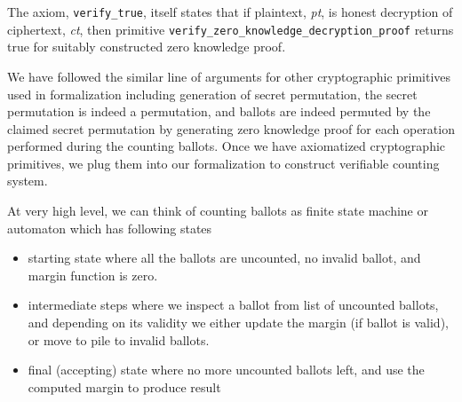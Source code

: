 \documentclass{llncs}
\begin{document}
 The axiom, \texttt{verify\_true}, itself states that if plaintext, \textit{pt}, 
 is honest
 decryption of ciphertext, \textit{ct}, then primitive
 \texttt{verify\_zero\_knowledge\_decryption\_proof} returns true for 
 suitably constructed zero knowledge proof.
 
 We have followed the similar line of 
 arguments for other cryptographic primitives used in formalization including generation
  of secret permutation, 
 the secret permutation is indeed a permutation, and ballots are indeed permuted by the
 claimed secret permutation by generating zero knowledge proof 
 for each operation performed during the counting ballots. Once we have axiomatized
  cryptographic primitives, we plug them into our 
 formalization to construct verifiable counting system. 
 
 At very high level, we can think of counting ballots as finite state machine or 
 automaton which has following states 
 \begin{itemize}
 \item starting state where all the ballots are uncounted, 
       no invalid ballot, and margin function is zero.
 \item intermediate steps where we inspect a ballot from list of uncounted ballots, 
 		and depending on its validity
       we either update the margin (if ballot is valid), or move to pile to 
       invalid ballots.
  \item final (accepting) state where no more uncounted ballots left, and use 
  		the computed margin to produce result  
 \end{itemize}
 
\end{document}
